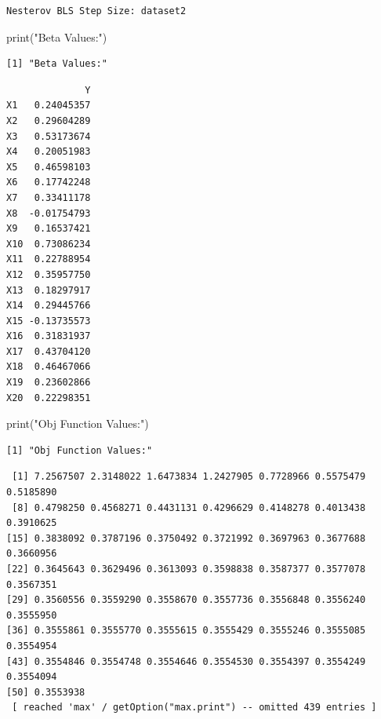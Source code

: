 \documentclass[
  letterpaper,
  DIV=11,
  numbers=noendperiod]{scrartcl}
\newenvironment{Shaded}{\begin{snugshade}}{\end{snugshade}}
\newcommand{\FunctionTok}[1]{\textcolor[rgb]{0.28,0.35,0.67}{#1}}
\newcommand{\NormalTok}[1]{\textcolor[rgb]{0.00,0.23,0.31}{#1}}
\newcommand{\SpecialCharTok}[1]{\textcolor[rgb]{0.37,0.37,0.37}{#1}}
\newcommand{\StringTok}[1]{\textcolor[rgb]{0.13,0.47,0.30}{#1}}
\begin{document}
\begin{verbatim}
Nesterov BLS Step Size: dataset2 
\end{verbatim}

\begin{Shaded}
\begin{Highlighting}[]
\FunctionTok{print}\NormalTok{(}\StringTok{"Beta Values:"}\NormalTok{)}
\end{Highlighting}
\end{Shaded}

\begin{verbatim}
[1] "Beta Values:"
\end{verbatim}

\begin{Shaded}
\end{Shaded}

\begin{verbatim}
              Y
X1   0.24045357
X2   0.29604289
X3   0.53173674
X4   0.20051983
X5   0.46598103
X6   0.17742248
X7   0.33411178
X8  -0.01754793
X9   0.16537421
X10  0.73086234
X11  0.22788954
X12  0.35957750
X13  0.18297917
X14  0.29445766
X15 -0.13735573
X16  0.31831937
X17  0.43704120
X18  0.46467066
X19  0.23602866
X20  0.22298351
\end{verbatim}

\begin{Shaded}
\begin{Highlighting}[]
\FunctionTok{print}\NormalTok{(}\StringTok{"Obj Function Values:"}\NormalTok{)}
\end{Highlighting}
\end{Shaded}

\begin{verbatim}
[1] "Obj Function Values:"
\end{verbatim}

\begin{Shaded}
\end{Shaded}

\begin{verbatim}
 [1] 7.2567507 2.3148022 1.6473834 1.2427905 0.7728966 0.5575479 0.5185890
 [8] 0.4798250 0.4568271 0.4431131 0.4296629 0.4148278 0.4013438 0.3910625
[15] 0.3838092 0.3787196 0.3750492 0.3721992 0.3697963 0.3677688 0.3660956
[22] 0.3645643 0.3629496 0.3613093 0.3598838 0.3587377 0.3577078 0.3567351
[29] 0.3560556 0.3559290 0.3558670 0.3557736 0.3556848 0.3556240 0.3555950
[36] 0.3555861 0.3555770 0.3555615 0.3555429 0.3555246 0.3555085 0.3554954
[43] 0.3554846 0.3554748 0.3554646 0.3554530 0.3554397 0.3554249 0.3554094
[50] 0.3553938
 [ reached 'max' / getOption("max.print") -- omitted 439 entries ]
\end{verbatim}
\end{document}
